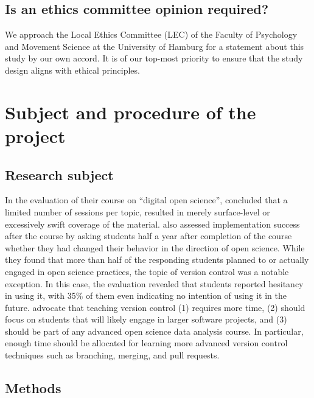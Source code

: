\documentclass[11pt,twoside,a4paper]{article}
\begin{document}
\subsection{Is an ethics committee opinion required?}

We approach the Local Ethics Committee (LEC) of the Faculty of Psychology and Movement Science at the University of Hamburg for a statement about this study by our own accord.
It is of our top-most priority to ensure that the study design aligns with ethical principles.

\section{Subject and procedure of the project}

\subsection{Research subject}


In the evaluation of their course on ``digital open science'',  concluded that a limited number of sessions per topic, resulted in merely surface-level or excessively swift coverage of the material.
 also assessed implementation success after the course by asking students half a year after completion of the course whether they had changed their behavior in the direction of open science.
While they found that more than half of the responding students planned to or actually engaged in open science practices, the topic of version control was a notable exception.
In this case, the evaluation revealed that students reported hesitancy in using it, with 35\% of them even indicating no intention of using it in the future.
 advocate that teaching version control (1) requires more time, (2) should focus on students that will likely engage in larger software projects, and (3) should be part of any advanced open science data analysis course.
In particular, enough time should be allocated for learning more advanced version control techniques such as branching, merging, and pull requests.

\subsection{Methods}
\end{document}
